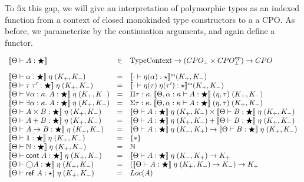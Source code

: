 To fix this gap, we will give an interpretation of polymorphic types
as an indexed function from a context of closed monokinded type
constructors to a a CPO.  As before, we parameterize by the
continuation arguments, and again define a functor.

\begin{displaymath}
\begin{array}{lcl}\interp{\judgeWK{A}{\bigstar}} &\in& \mathrm{Type Context} \to (CPO_\bot \times CPO^{op}_\bot) \to CPO 
\\[1em]
\interp{\judgeWK{\alpha}{\bigstar}}\;\eta\;(K_+,K_-) & = & 
    \interpmono{\judgeWK[\cdot]{\eta(\alpha)}{\star}}(K_+, K_-) 
\\
\interp{\judgeWK{\tau\;\tau'}{\bigstar}}\;\eta\;(K_+,K_-) & = & 
    \interpmono{\judgeWK[\cdot]{\eta(\tau)\;\eta(\tau')}{\star}}(K_+, K_-) 
\\
\interp{\judgeWK{\forall \alpha:\kappa.\;A}{\bigstar}}\;\eta\;(K_+,K_-) & = & 
    \Pi \tau:\kappa.\; 
        \interp{\judgeWK[\Theta, \alpha:\kappa]{A}{\bigstar}}\;(\eta,\tau)\;(K_+,K_-) 
\\
\interp{\judgeWK{\exists \alpha:\kappa.\;A}{\bigstar}}\;\eta\;(K_+,K_-) & = & 
    \Sigma \tau:\kappa.\; 
        \interp{\judgeWK[\Theta, \alpha:\kappa]{A}{\bigstar}}\;(\eta,\tau)\;(K_+,K_-) 
\\
\interp{\judgeWK{A \times B}{\bigstar}}\;\eta\;(K_+,K_-) & = & 
   \interp{\judgeWK{A}{\bigstar}}\;\eta\;(K_+,K_-) \times
   \interp{\judgeWK{B}{\bigstar}}\;\eta\;(K_+,K_-) 
\\
\interp{\judgeWK{A + B}{\bigstar}}\;\eta\;(K_+,K_-) & = & 
   \interp{\judgeWK{A}{\bigstar}}\;\eta\;(K_+,K_-) +
   \interp{\judgeWK{B}{\bigstar}}\;\eta\;(K_+,K_-) 
\\
\interp{\judgeWK{A \to B}{\bigstar}}\;\eta\;(K_+,K_-) & = & 
   \interp{\judgeWK{A}{\bigstar}}\;\eta\;(K_-,K_+) \to
   \interp{\judgeWK{B}{\bigstar}}\;\eta\;(K_+,K_-) 
\\
\interp{\judgeWK{\unittype}{\bigstar}}\;\eta\;(K_+, K_-) & = & \setof{*} 
\\

\interp{\judgeWK{\N}{\bigstar}}\;\eta\;(K_+, K_-) & = &  \N 
\\
\interp{\judgeWK{\cont{A}}{\bigstar}}\;\eta\;(K_+,K_-) & = & 
   \interp{\judgeWK{A}{\bigstar}}\;\eta\;(K_-,K_+) \to K_+
\\
\interp{\judgeWK{\monad{A}}{\bigstar}}\;\eta\;(K_+,K_-) & = & 
   (\interp{\judgeWK{A}{\bigstar}}\;\eta\;(K_+,K_-) \to K_-) \to K_+
\\
\interp{\judgeWK{\reftype{A}}{\star}}\;\eta\;(K_+, K_-) & = & Loc(A) 
\\
\end{array}
\end{displaymath}


